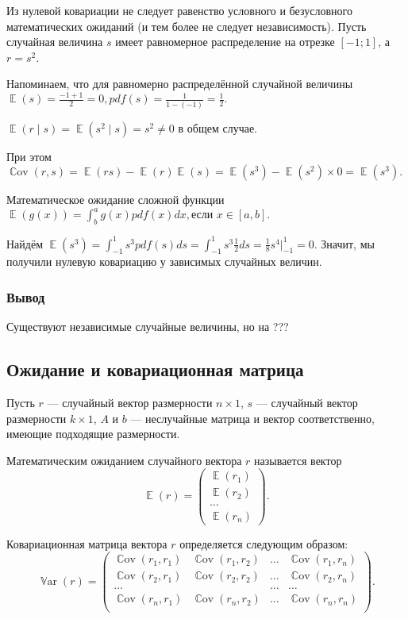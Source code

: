 \documentclass[12pt]{article}
\DeclareMathOperator{\Cov}{\mathbb{C}ov}
\DeclareMathOperator{\Var}{\mathbb{V}ar}
\DeclareMathOperator{\E}{\mathbb{E}}
\begin{document}
\begin{problem}
    Из нулевой ковариации не следует равенство условного и безусловного математических ожиданий (и тем более не следует независимость). Пусть случайная величина $s$ имеет равномерное распределение на отрезке $[-1; 1]$, а $r = s^2$.

    \begin{sol}

    Напоминаем, что для равномерно распределённой случайной величины \(\E(s) = \frac{-1+1}{2} = 0, pdf(s) = \frac{1}{1 - (-1)} = \frac{1}{2}.\)
    
    \(\E(r \mid s) = \E(s^2 \mid s) = s^2 \neq 0\) в общем случае.

    При этом \(\Cov(r, s) = \E(rs) - \E(r)\E(s) = \E(s^3) - \E(s^2) \times 0 = \E(s^3).\)

    Математическое ожидание сложной функции \( \E(g(x)) = \int^a_b g(x) pdf(x) dx, \text{если } x \in [a, b].\)
    
    Найдём \(\E(s^3) = \int^{1}_{-1} s^3 pdf(s) ds = \int^{1}_{-1} s^3 \frac{1}{2} ds = \frac{1}{8} s^4 | ^1_{-1} = 0.\) Значит, мы получили нулевую ковариацию у зависимых случайных величин.    
    \end{sol}
\end{problem}

\subsubsection*{Вывод}
Существуют независимые случайные величины, но на ???

\subsection{Ожидание и ковариационная матрица }

Пусть $r$ — случайный вектор размерности $n \times 1$, $s$ — случайный вектор размерности $k \times 1$, $A$ и $b$ — неслучайные матрица и вектор соответственно, имеющие подходящие размерности.

Математическим ожиданием случайного вектора $r$ называется вектор
\[
\E(r) = \begin{pmatrix}
	\E(r_1)  \\
	\E(r_2)  \\
        \dots \\
        \E(r_n)
      \end{pmatrix}.
\]

Ковариационная матрица вектора $r$ определяется следующим образом:
\[
\Var(r) = \begin{pmatrix}
	\Cov(r_1,r_1) & \Cov(r_1,r_2) & \dots & \Cov(r_1,r_n) \\
	\Cov(r_2,r_1) & \Cov(r_2,r_2) & \dots & \Cov(r_2,r_n) \\
        \dots & & \dots & \dots\\
        \Cov(r_n,r_1) & \Cov(r_n,r_2) & \dots & \Cov(r_n,r_n) \\
      \end{pmatrix}.
\]
\end{document}
